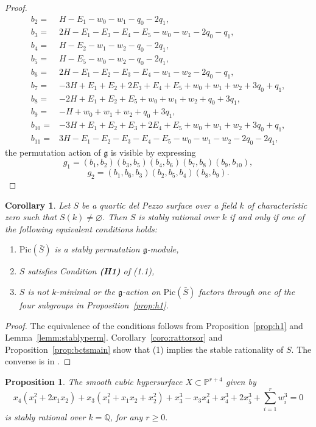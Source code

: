 \documentclass[10pt,a4paper]{amsart}
\newtheorem{prop}{Proposition}
\newtheorem{coro}{Corollary}
\def\Pic{\mathrm{Pic}}
\def\bP{{\mathbb P}}
\def\bQ{{\mathbb Q}}
\begin{document}
\begin{proof}
\begin{align*}
b_2={}&
  H-E_1-w_0-w_1-q_0-2q_1,\\
b_3={}&
  2H-E_1-E_3-E_4-E_5-w_0-w_1-2q_0-q_1,\\
b_4={}&
  H-E_2-w_1-w_2-q_0-2q_1,\\
b_5={}&
  H-E_5-w_0-w_2-q_0-2q_1,\\
b_6={}&
  2H-E_1-E_2-E_3-E_4-w_1-w_2-2q_0-q_1,\\
b_7={}&
  -3H+E_1+E_2+2E_3+E_4+E_5
  +w_0+w_1+w_2+3q_0+q_1,\\
b_8={}&
  -2H+E_1+E_2+E_5
  +w_0+w_1+w_2+q_0+3q_1,\\
b_9={}&
  -H+w_0+w_1+w_2+q_0+3q_1,\\
b_{10}={}&
  -3H+E_1+E_2+E_3+2E_4+E_5
  +w_0+w_1+w_2+3q_0+q_1,\\
b_{11}={}&
  3H-E_1-E_2-E_3-E_4-E_5
  -w_0-w_1-w_2-2q_0-2q_1,
\end{align*}
the permutation action of $\mathfrak g$ is visible by expressing
$$
g_1=(b_1,b_2)(b_3,b_5)(b_4,b_6)
  (b_7,b_8)(b_9,b_{10}),
  $$
  $$
  g_2=(b_1,b_6,b_3)(b_2,b_5,b_4)(b_8,b_9).
$$
\end{proof}
\begin{coro}\label{coro:dp4stab}
    Let $S$ be a quartic del Pezzo surface over a field $k$ of characteristic zero such that $S(k)\ne \varnothing$. Then $S$ is stably rational over $k$ if and only if one of the following equivalent conditions holds:
    \begin{enumerate}
           \item $\Pic(\bar{S})$ is a stably permutation $\mathfrak g$-module,
           \item $S$ satisfies Condition {\bf(H1)} of (1.1),
\item $S$ is not $k$-minimal or the $\mathfrak g$-action on $\Pic(\bar{S})$ factors through one of the four subgroups in Proposition~\ref{prop:h1}.
     \end{enumerate}
\end{coro}
\begin{proof}
    The equivalence of the conditions follows from Proposition~\ref{prop:h1} and Lemma~\ref{lemm:stablyperm}. Corollary~\ref{coro:rattorsor} and Proposition~\ref{prop:bctsmain} show that (1) implies the stable rationality of $S$. The converse is in \cite{Maninperfect}.
\end{proof}

\begin{prop}
    \label{prop:cubictypeI3}
    The smooth cubic hypersurface $X\subset\bP^{r+4}$ given by
    $$
    x_4(x_1^2+2x_1x_2)+x_3(x_1^2+x_1x_2+x_2^2)+x_3^3-x_3x_4^2+x_4^3+2x_5^3+\sum_{i=1}^rw_i^3=0
    $$
    is stably rational over $k=\bQ$, for any $r\geq 0.$
\end{prop}
\end{document}
